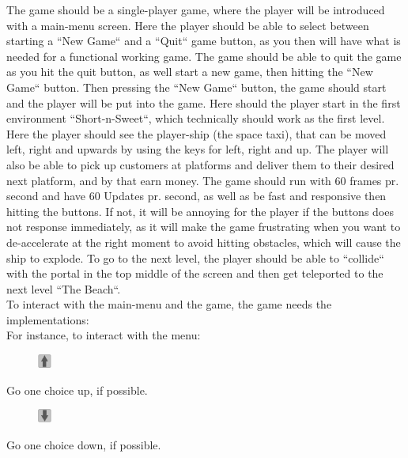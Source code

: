 \documentclass[../master.tex]{subfiles}
\begin{document}
The game should be a single-player game, where the player will be introduced with a main-menu screen. Here the player should be able to select between starting a ``New Game`` and a ``Quit`` game button, as you then will have what is needed for a functional working game. The game should be able to quit the game as you hit the quit button, as well start a new game, then hitting the ``New Game`` button. Then pressing the ``New Game`` button, the game should start and the player will be put into the game. Here should the player start in the first environment ``Short-n-Sweet``, which technically should work as the first level. Here the player should see the player-ship (the space taxi), that can be moved left, right and upwards by using the keys for left, right and up. The player will also be able to pick up customers at platforms and deliver them to their desired next platform, and by that earn money. The game should run with 60 frames pr. second and have 60 Updates pr. second, as well as be fast and responsive then hitting the buttons. If not, it will be annoying for the player if the buttons does not response immediately, as it will make the game frustrating when you want to de-accelerate at the right moment to avoid hitting obstacles, which will cause the ship to explode. To go to the next level, the player should be able to ``collide`` with the portal in the top middle of the screen and then get teleported to the next level ``The Beach``.\\

To interact with the main-menu and the game, the game needs the implementations:\\
For instance, to interact with the menu:\\
\begin{figure}
	\vspace{-1.8mm}
	\begin{centering}
		\includegraphics[width=0.04\textwidth]{./Pictures/Pil_op.png}
	\end{centering}
	\vspace{-6mm}
\end{figure}
Go one choice up, if possible.\\

\begin{figure}
	\vspace{-5.8mm}
	\begin{centering}
		\includegraphics[width=0.04\textwidth]{./Pictures/Pil_ned.png}
	\end{centering}
	\vspace{-6mm}
\end{figure}
Go one choice down, if possible.\\
\end{document}
